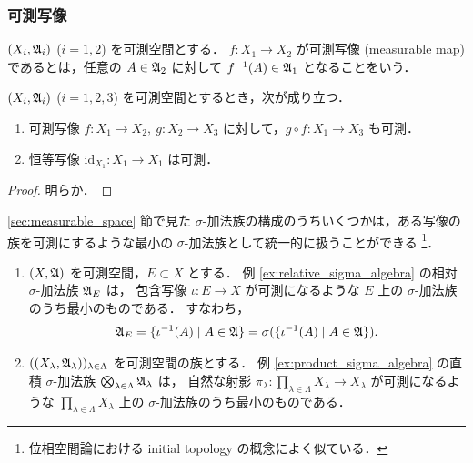 \subsubsection{可測写像}

\begin{definition}
    $(X_i,\mathfrak{A}_i)$ ($i=1,2$) を可測空間とする．
    $f:X_1\to X_2$ が可測写像 (measurable map) であるとは，任意の $A\in\mathfrak{A}_2$ に対して $f^{-1}(A)\in\mathfrak{A}_1$ となることをいう．
\end{definition}

\begin{proposition}\label{prop:Meas_prop}
    $(X_i,\mathfrak{A}_i)$ ($i=1,2,3$) を可測空間とするとき，次が成り立つ．
    \begin{enumerate}
        \item 可測写像 $f:X_1\to X_2,\ g:X_2\to X_3$ に対して，$g\circ f:X_1\to X_3$ も可測．
        \item 恒等写像 $\mathrm{id}_{X_1}:{X_1}\to{X_1}$ は可測．
    \end{enumerate}
\end{proposition}

\begin{proof}
    明らか．
\end{proof}

\begin{example}\label{ex:initial_sigma_algebra}
    \ref{sec:measurable_space} 節で見た $\sigma$-加法族の構成のうちいくつかは，ある写像の族を可測にするような最小の $\sigma$-加法族として統一的に扱うことができる
    \footnote{位相空間論における initial topology の概念によく似ている．}．
    \begin{enumerate}
        \item
            $(X,\mathfrak{A})$ を可測空間，$E\subset X$ とする．
            例 \ref{ex:relative_sigma_algebra} の相対 $\sigma$-加法族 $\mathfrak{A}_E$ は，
            包含写像 $\iota:E\to X$ が可測になるような $E$ 上の $\sigma$-加法族のうち最小のものである．
            すなわち，
            \begin{align*}
                \mathfrak{A}_E
                =\{\iota^{-1}(A)\mid A\in\mathfrak{A}\}
                =\sigma(\{\iota^{-1}(A)\mid A\in\mathfrak{A}\}).
            \end{align*}
        \item
            $((X_\lambda,\mathfrak{A}_\lambda))_{\lambda\in\Lambda}$ を可測空間の族とする．
            例 \ref{ex:product_sigma_algebra} の直積 $\sigma$-加法族 $\bigotimes_{\lambda\in\Lambda}\mathfrak{A}_\lambda$ は，
            自然な射影 $\pi_\lambda:\prod_{\lambda\in\Lambda}X_\lambda\to X_\lambda$ が可測になるような
            $\prod_{\lambda\in\Lambda}X_\lambda$ 上の $\sigma$-加法族のうち最小のものである．
        \end{enumerate}
\end{example}

